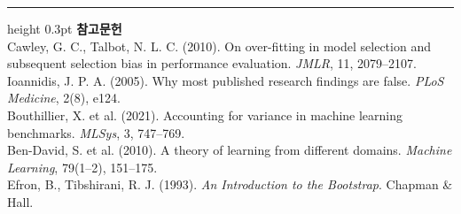\documentclass[10pt]{article}
\begin{document}
\vspace{0.6em}
\hrule height 0.3pt
\vspace{0.5em}
{\footnotesize
\textbf{참고문헌}\\[0.3em]
Cawley, G. C., Talbot, N. L. C. (2010). On over-fitting in model selection and
subsequent selection bias in performance evaluation. \emph{JMLR}, 11, 2079--2107.\\[0.15em]
Ioannidis, J. P. A. (2005). Why most published research findings are false.
\emph{PLoS Medicine}, 2(8), e124.\\[0.15em]
Bouthillier, X. et al. (2021). Accounting for variance in machine learning
benchmarks. \emph{MLSys}, 3, 747--769.\\[0.15em]
Ben-David, S. et al. (2010). A theory of learning from different domains.
\emph{Machine Learning}, 79(1--2), 151--175.\\[0.15em]
Efron, B., Tibshirani, R. J. (1993). \emph{An Introduction to the Bootstrap}.
Chapman \& Hall.
}
\end{document}
